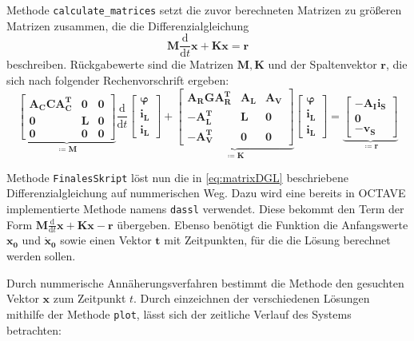 	Methode \texttt{calculate\_matrices} setzt die zuvor berechneten Matrizen zu größeren Matrizen zusammen, die die Differenzialgleichung
	\begin{equation}
	\mathbf{M} \frac{\text{d}}{\text{d}t} \mathbf{x} + \mathbf{K} \mathbf{x} = \mathbf{r}
	\label{eq:matrixDGL}
	\end{equation}
	beschreiben. Rückgabewerte sind die Matrizen $\mathbf{M, K}$ und der Spaltenvektor $\mathbf{r}$, die sich nach folgender Rechenvorschrift ergeben:
	\begin{equation}
	\underbrace{
		\begin{bmatrix}
			\mathbf{A_C C A_C^T} & \mathbf{0} & \mathbf{0}\\
			\mathbf{0} & \mathbf{L} & \mathbf{0}\\
			\mathbf{0} & \mathbf{0} & \mathbf{0}
		\end{bmatrix}
	}_{\coloneqq \mathbf{M}}
	\frac{\text{d}}{\text{d}t}
	\begin{bmatrix}
		\boldsymbol{\varphi}\\
		\mathbf{i_L}\\
		\mathbf{i_L}
	\end{bmatrix}
	+
	\underbrace{
		\begin{bmatrix}
		\mathbf{A_R G A_R^T} & \mathbf{A_L} & \mathbf{A_V}\\
		-\mathbf{A_L^T} & \mathbf{L} & \mathbf{0}\\
		-\mathbf{A_V^T} & \mathbf{0} & \mathbf{0}
		\end{bmatrix}
	}_{\coloneqq \mathbf{K}}
	\begin{bmatrix}
	\boldsymbol{\varphi}\\
	\mathbf{i_L}\\
	\mathbf{i_L}
	\end{bmatrix}
	=
	\underbrace{
		\begin{bmatrix}
			-\mathbf{A_I i_S}\\
			\mathbf{0}\\
			-\mathbf{v_S}
		\end{bmatrix}
	}_{\coloneqq \mathbf{r}}
	\end{equation}
	
	Methode \texttt{FinalesSkript} löst nun die in \ref{eq:matrixDGL} beschriebene Differenzialgleichung auf nummerischen Weg. Dazu wird eine bereits in OCTAVE implementierte Methode namens \texttt{dassl} verwendet. Diese bekommt den Term der Form $\mathbf{M} \frac{\text{d}}{\text{d}t} \mathbf{x} + \mathbf{K} \mathbf{x} - \mathbf{r}$ übergeben. Ebenso benötigt die Funktion die Anfangswerte $\mathbf{x_0}$ und $\mathbf{\dot{x}_0}$ sowie einen Vektor $\mathbf{t}$ mit Zeitpunkten, für die die Lösung berechnet werden sollen.

	Durch nummerische Annäherungsverfahren bestimmt die Methode den gesuchten Vektor $\mathbf{x}$ zum Zeitpunkt $t$. Durch einzeichnen der verschiedenen Lösungen mithilfe der Methode \texttt{plot}, lässt sich der zeitliche Verlauf des Systems betrachten: 